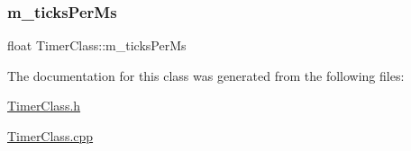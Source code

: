 \subsubsection{\texorpdfstring{m\+\_\+ticks\+Per\+Ms}{m\_ticksPerMs}}
{\footnotesize\ttfamily float Timer\+Class\+::m\+\_\+ticks\+Per\+Ms\hspace{0.3cm}{\ttfamily [private]}}



The documentation for this class was generated from the following files\+:\begin{DoxyCompactItemize}
\item 
\hyperlink{_timer_class_8h}{Timer\+Class.\+h}\item 
\hyperlink{_timer_class_8cpp}{Timer\+Class.\+cpp}\end{DoxyCompactItemize}
